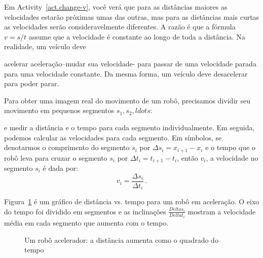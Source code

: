 Em Activity~\ref{act.change-v}, você verá que para as distâncias maiores as velocidades estarão próximas umas das outras, mas para as distâncias mais curtas as velocidades serão consideravelmente diferentes. A razão é que a fórmula $v=s/t$ assume que a velocidade é constante ao longo de toda a distância. Na realidade, um veículo deve {acelerar {aceleração}--mudar sua velocidade- para passar de uma velocidade parada para uma velocidade constante. Da mesma forma, um veículo deve desacelerar para poder parar.

Para obter uma imagem real do movimento de um robô, precisamos dividir seu movimento em pequenos segmentos $s_1,s_2,ldots$:
\begin{center}
\end{center}
e medir a distância e o tempo para cada segmento individualmente. Em seguida, podemos calcular as velocidades para cada segmento. Em símbolos, se denotarmos o comprimento do segmento $s_i$ por $\Delta s_i = x_{i+1}-x_i$ e o tempo que o robô leva para cruzar o segmento $s_i$ por $\Delta t_i = t_{i+1}-t_i$, então $v_i$, a velocidade no segmento $s_i$ é dada por:
\[v_i = \frac{\Delta s_i}{\Delta t_i}\,.\]

Figura~\ref{fig.instant-v} é um gráfico de distância vs. tempo para um robô em aceleração. O eixo do tempo foi dividido em segmentos e as inclinações $ \displaystyle \frac{Delta s_i}{Delta t_i}$ mostram a velocidade média em cada segmento que aumenta com o tempo.

\begin{figure}
\begin{center}
\caption{Um robô acelerador: a distância aumenta como o quadrado do tempo}\label{fig.instant-v}
\end{center}
\end{figure}

}
